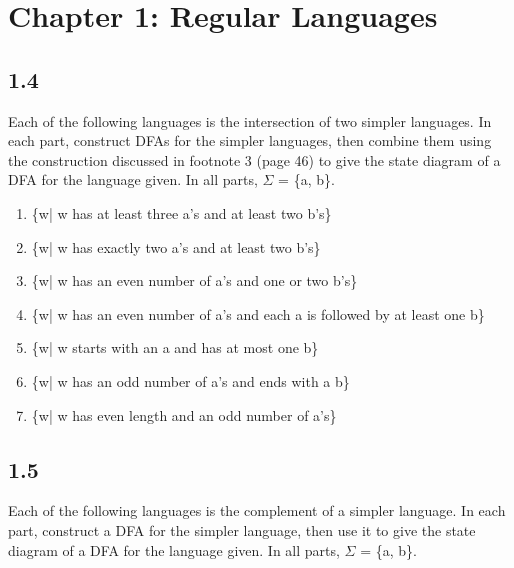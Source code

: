 \section*{Chapter 1: Regular Languages}

\subsection*{1.4}

Each of the following languages is the intersection of two simpler languages. In each part, construct DFAs for the simpler languages, then combine them using the construction discussed in footnote 3 (page 46) to give the state diagram of a DFA for the language given. In all parts, $\Sigma$ = \{a, b\}.

\begin{enumerate}[label=(\alph*), leftmargin=2.5em]

\item \{w| w has at least three a's and at least two b's\}

\item \{w| w has exactly two a's and at least two b's\}

\item \{w| w has an even number of a's and one or two b's\}

\item \{w| w has an even number of a's and each a is followed by at least one b\}

\item \{w| w starts with an a and has at most one b\}

\item \{w| w has an odd number of a's and ends with a b\}

\item \{w| w has even length and an odd number of a's\}

\end{enumerate}


\subsection*{1.5}

Each of the following languages is the complement of a simpler language. In each part, construct a DFA for the simpler language, then use it to give the state diagram of a DFA for the language given. In all parts, $\Sigma$ = \{a, b\}.

